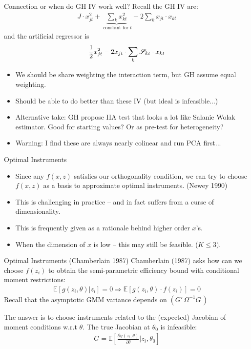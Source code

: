 \documentclass[aspectratio=169,10pt]{beamer}
\begin{document}
\begin{frame}{Connection or when do GH IV work well?}
Recall the GH IV are:
\begin{align*}
J \cdot x_{jt}^2 + \underbrace{\sum_k x_{kt}^2}_{\text{ constant for } t } - 2 \sum_k x_{jt} \cdot x_{kt}
\end{align*}
and the artificial regressor is
\begin{align*}
\frac{1}{2} x_{jt}^2 - 2 x_{jt} \cdot \sum_k \mathscr{S}_{kt}  \cdot x_{kt}
\end{align*}
\begin{itemize}
\item We should be \alert{share weighting} the interaction term, but GH assume equal weighting.\\
\item Should be able to do better than these IV (but ideal is infeasible...)
\item Alternative take: GH propose IIA test that looks a lot like Salanie Wolak estimator. Good for starting values? Or as pre-test for heterogeneity?
\item Warning: I find these are always nearly colinear and run PCA first...
\end{itemize}
\end{frame}


\begin{frame}{Optimal Instruments}
\begin{itemize}
\item Since any $f(x,z)$ satisfies our orthogonality condition, we can try to choose $f(x,z)$ as a \alert{basis} to approximate optimal instruments. (Newey 1990)
\item This is challenging in practice -- and in fact suffers from a curse of dimensionality.
\item This is frequently given as a rationale behind higher order $x$'s.
\item When the dimension of $x$ is low -- this may still be feasible. ($K \leq 3)$.
\end{itemize}
\end{frame}



\begin{frame}{Optimal Instruments (Chamberlain 1987)}
Chamberlain (1987) asks how can we choose $f(z_i)$ to obtain the semi-parametric efficiency bound with conditional moment restrictions:
\begin{align*}
\mathbb{E}[g(z_i,\theta) | z_i]=0 \Rightarrow \mathbb{E}[g(z_i,\theta) \cdot f(z_i) ]=0 
\end{align*}
Recall that the asymptotic GMM variance depends on $(G'\, \Omega^{-1} G\,)$

The answer is to choose instruments related to the (expected) Jacobian of moment conditions w.r.t $\theta$. The true Jacobian at $\theta_0$ is \alert{infeasible}:
\begin{align*}
G=\mathbb{E}\left[\frac{\partial g(z_i,\theta)}{\partial \theta} | z_i, \theta_0 \right]
\end{align*}
\end{frame}
\end{document}
